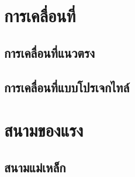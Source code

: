 \documentclass[a4paper,12pt]{book} %
\begin{document}
\mainmatter %


\chapter{การเคลื่อนที่}
	\section{การเคลื่อนที่แนวตรง}
		\begin{c3}\end{c3}
		
	\section{การเคลื่อนที่แบบโปรเจกไทล์}
		\begin{c3}\end{c3}
		
			\vspace{1in}
		
			\vfill
		\newpage
\chapter{สนามของแรง}
	\section{สนามแม่เหล็ก}
		\begin{c3}\end{c3}
			\vfill
		
			\vspace{1in}
		
\end{document}
